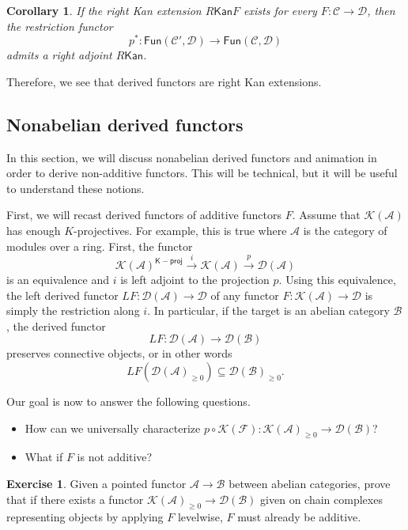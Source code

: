 \documentclass[10pt, oneside]{memoir}
\newtheorem{cor}[thm]{Corollary}
\theoremstyle{definition}
\newtheorem{exer}[thm]{Exercise}
\theoremstyle{remark}
\theoremstyle{plain}
\theoremstyle{definition}
\theoremstyle{remark}
\newcommand{\mc}[1]{\mathcal{#1}}
\newcommand{\ms}[1]{\mathsf{#1}}
\newcommand{\1}{\mathbf{1}}
\newcommand{\2}{\mathbf{2}}
\newcommand{\3}{\mathbf{3}}
\begin{document}
\begin{cor}
    If the right Kan extension \(R \ms{Kan} F \) exists for every \(F \colon \mc{C} \to \mc{D} \), then the restriction functor
    \[ p^* \colon \ms{Fun}(\mc{C}', \mc{D}) \to \ms{Fun}(\mc{C}, \mc{D}) \]
    admits a right adjoint \(R\ms{Kan} \).
\end{cor}

Therefore, we see that derived functors are right Kan extensions.


\subsection{Nonabelian derived functors}%
\label{sub:Nonabelian derived functors}

In this section, we will discuss nonabelian derived functors and animation in order to derive non-additive functors. This will be technical, but it will be useful to understand these notions.

First, we will recast derived functors of additive functors \(F \). Assume that \(\mc{K}(\mc{A}) \) has enough \(K \)-projectives. For example, this is true where \(\mc{A} \) is the category of modules over a ring. First, the functor
\[ \mc{K}(\mc{A})^{\ms{K-proj}} \xrightarrow{i} \mc{K}(\mc{A}) \xrightarrow{p} \mc{D}(\mc{A}) \]
is an equivalence and \(i \) is left adjoint to the projection \(p \). Using this equivalence, the left derived functor \(LF \colon \mc{D}(\mc{A}) \to \mc{D} \) of any functor \(F \colon \mc{K}(\mc{A}) \to \mc{D} \) is simply the restriction along \(i \). In particular, if the target is an abelian category \(\mc{B} \), the derived functor
\[ LF \colon \mc{D}(\mc{A}) \to \mc{D}(\mc{B}) \]
preserves connective objects, or in other words
\[ LF(\mc{D}(\mc{A})_{\geq 0}) \subseteq \mc{D}(\mc{B})_{\geq 0}. \]

Our goal is now to answer the following questions.
\begin{itemize}
    \item How can we universally characterize \(p \circ \mc{K}(\mc{F}) \colon \mc{K}(\mc{A})_{\geq 0} \to \mc{D}(\mc{B}) \)?
    \item What if \(F \) is not additive?
\end{itemize}

\begin{exer}
    Given a pointed functor \(\mc{A} \to \mc{B} \) between abelian categories, prove that if there exists a functor \(\mc{K}(\mc{A})_{\geq 0} \to \mc{D}(\mc{B}) \) given on chain complexes representing objects by applying \(F \) levelwise, \(F \) must already be additive.
\end{exer}
\end{document}
